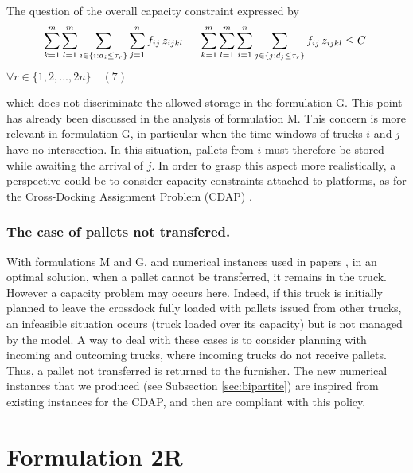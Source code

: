 \documentclass[preprint,12pt,authoryear]{elsarticle}
\begin{document}
The question of the overall capacity constraint expressed by 
%
 $$\sum\limits_{k=1}^{m} \sum_{l=1}^{m} \sum_{i\in\{i:a_{i} \le \tau_r\}} \sum_{j=1}^{n} f_{ij} \, z_{ijkl} \ \color{black}{-}\color{black} \ \sum_{k=1}^{m} \sum_{l=1}^{m} \color{black}\sum_{i=1}^{n}\color{black} \sum_{j\in\{j:d_{j} \le \tau_r\}} f_{ij} \, z_{ijkl} \le  C \hspace{1mm}$$
 \hfill $ \forall r \in \{1,2,...,2n\} \quad (7)$
 
\bigskip
\noindent
which does not discriminate the allowed storage in the formulation G.
%  
This point has already been discussed in the analysis of formulation M.
This concern is more relevant in formulation G, in particular when the time windows of trucks $i$ and $j$ have no intersection. In this situation, pallets from $i$ must therefore be stored while awaiting the arrival of $j$.
    In order to grasp this aspect more realistically, a perspective could be to consider capacity constraints attached to platforms, as for the Cross-Docking Assignment Problem (CDAP) \citep{Zhu2009} .      

%
%
\subsubsection{The case of pallets not transfered.}\label{sec:palletnotTransferred}

With formulations M and G, and numerical instances used in papers \cite{GELAREH2016,MIAO2009},  in an optimal solution, when a pallet cannot be transferred, it remains in the truck. However a capacity problem may occurs here. Indeed, if this truck is initially planned to leave the crossdock fully loaded with pallets issued from other trucks, an infeasible situation occurs (truck loaded over its capacity) but is not managed by the model. 
%
A way to deal with these cases is to consider planning with incoming and outcoming trucks, where incoming trucks do not receive pallets. Thus, a pallet not transferred is returned to the furnisher. The new numerical instances that we produced (see Subsection \ref{sec:bipartite}) are inspired from existing instances for the CDAP, and then are compliant with this policy.
   


%
%
\section{Formulation 2R}\label{sec:Formulation2R}
\end{document}
